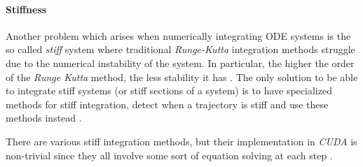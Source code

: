 \pagebreak
\paragraph{Stiffness} %
\label{sub:stiffness}

Another problem which arises when numerically integrating ODE systems is the so called \emph{stiff} system where traditional \emph{Runge-Kutta} integration methods struggle due to the numerical instability of the system. In particular, the higher the order of the \emph{Runge Kutta} method, the less stability it has \cite{skvortsov_accuracy_2003}. The only solution to be able to integrate stiff systems (or stiff sections of a system) is to have specialized methods for stiff integration, detect when a trajectory is stiff and use these methods instead
\cite{shampine_detecting_1977}.

There are various stiff integration methods, but their implementation in \emph{CUDA} is non-trivial since they all involve some sort of equation solving
at each step \cite{butcher_numerical_2008}.

